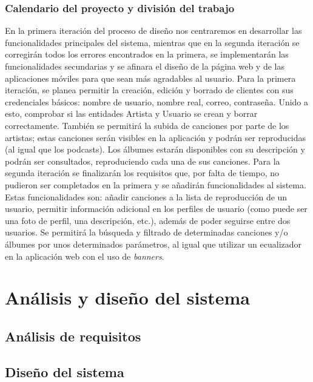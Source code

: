 \documentclass{article}
\begin{document}
\subsubsection{Calendario del proyecto y división del trabajo}
En la primera iteración del proceso de diseño nos centraremos en desarrollar las funcionalidades principales del sistema, mientras que en la segunda iteración se corregirán todos los errores encontrados en la primera, se implementarán las funcionalidades secundarias y se afinara el diseño de la página web y de las aplicaciones móviles para que sean más agradables al usuario. 
\hfill \break
Para la primera iteración, se planea permitir la creación, edición y borrado de clientes con sus credenciales básicos: nombre de usuario, nombre real, correo, contraseña. Unido a esto, comprobar si las entidades Artista y Usuario se crean y borrar correctamente.  También se permitirá la subida de canciones por parte de los artistas; estas canciones serán visibles en la aplicación y podrán ser reproducidas (al igual que los podcasts). Los álbumes estarán disponibles con su descripción y podrán ser consultados, reproduciendo cada una de sus canciones.
\hfill \break
Para la segunda iteración se finalizarán los requisitos que, por falta de tiempo, no pudieron ser completados en la primera y se añadirán funcionalidades al sistema. Estas funcionalidades son: añadir canciones a la lista de reproducción de un usuario, permitir información adicional en los perfiles de usuario (como puede ser una foto de perfil, una descripción, etc.), además de poder seguirse entre dos usuarios. Se permitirá la búsqueda y filtrado de determinadas canciones y/o álbumes por unos determinados parámetros, al igual que utilizar un ecualizador en la aplicación web con el uso de \textit{banners}.


\newpage
\section{Análisis y diseño del sistema}

\subsection{Análisis de requisitos}

\subsection{Diseño del sistema}
\end{document}
